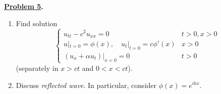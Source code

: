 \documentclass{article}
\theoremstyle{definition}
\newenvironment{boldenv}{\bfseries\boldmath}{}
\begin{document}
\begin{boldenv}
    \underline{Problem 5}. \begin{enumerate}
        \item Find solution
        \[\begin{cases}
            u_{tt} - c^2u_{xx} = 0 & t > 0, x > 0\\
            u|_{t=0} = \phi(x),\quad u_t|_{t=0} = c\phi'(x) & x > 0\\
            (u_x + \alpha u_t)|_{x=0} = 0 & t > 0
        \end{cases}\]
        (separately in $x > ct$ and $0 < x < ct$).

        \item Discuss \textit{reflected wave}. In particular, consider $\phi(x) = e^{ikx}$.
    \end{enumerate}
\end{boldenv}
\end{document}
